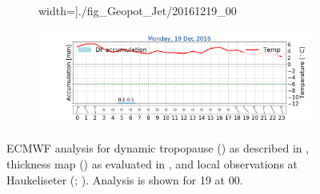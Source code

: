 \begin{figure}[ht!]
\begin{subfigure}[b]{0.49\textwidth}
		width=\textwidth]{./fig_Geopot_Jet/20161219_00}
		\caption{} \label{fig:GP19_00}
	\end{subfigure}
	\begin{subfigure}[b]{0.49\textwidth}
		\includegraphics[trim={4.9cm 1.cm 1.5cm 1cm},clip,
		width=\textwidth]{./fig_weathermast/T_P_U_20161219}
		\caption{} \label{fig:TPU19}
	\end{subfigure}
	\caption{ECMWF analysis for dynamic tropopause (\protect{}) as described in , thickness map (\protect{}) as evaluated in , and local observations at Haukeliseter (\protect{}; ). Analysis is shown for \SI{19}{\dec} at 0\SI{0}{\UTC}. %
    }\label{fig:weather:19}
\end{figure}



